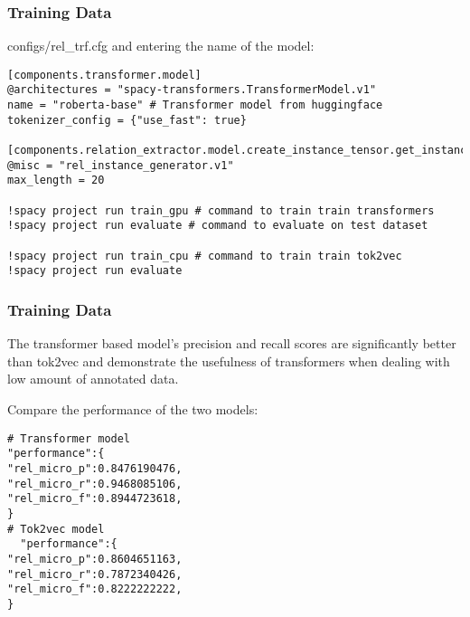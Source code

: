 \begin{frame}[fragile]\frametitle{Training Data}

configs/rel\_trf.cfg and entering the name of the model:

\begin{lstlisting}
[components.transformer.model]
@architectures = "spacy-transformers.TransformerModel.v1"
name = "roberta-base" # Transformer model from huggingface
tokenizer_config = {"use_fast": true}

[components.relation_extractor.model.create_instance_tensor.get_instances]
@misc = "rel_instance_generator.v1"
max_length = 20

!spacy project run train_gpu # command to train train transformers
!spacy project run evaluate # command to evaluate on test dataset

!spacy project run train_cpu # command to train train tok2vec
!spacy project run evaluate
\end{lstlisting}

\end{frame}

\begin{frame}[fragile]\frametitle{Training Data}

The transformer based model’s precision and recall scores are significantly better than tok2vec and demonstrate the usefulness of transformers when dealing with low amount of annotated data.

Compare the performance of the two models:

\begin{lstlisting}
# Transformer model
"performance":{
"rel_micro_p":0.8476190476,
"rel_micro_r":0.9468085106,
"rel_micro_f":0.8944723618,
}
# Tok2vec model
  "performance":{
"rel_micro_p":0.8604651163,
"rel_micro_r":0.7872340426,
"rel_micro_f":0.8222222222,
}
\end{lstlisting}



\end{frame}



